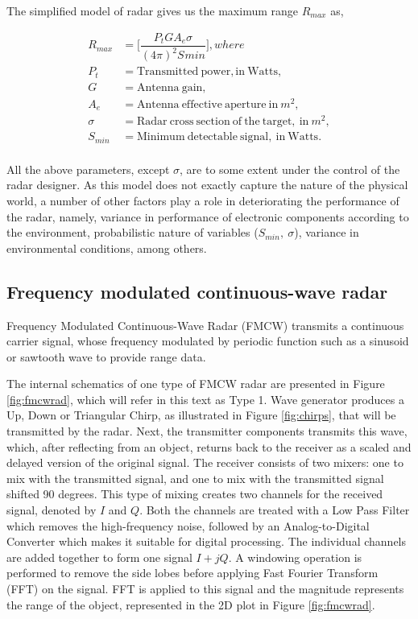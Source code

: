 The simplified model of radar gives us the maximum range $R_{max}$ as,

\begin{equation}\label{radmodel}
\begin{aligned}
R_{max}&=\bigg[ \dfrac{P_{t}GA_{e}\sigma}{(4\pi)^2S_{}min}\bigg],       where\\
P_{t} &= \mathrm{Transmitted\ power, in \ Watts,}\\
G &= \mathrm{Antenna\ gain},\\
A_{e} &= \mathrm{Antenna\  effective \ aperture \ in}\ m^2,\\
\sigma &= \mathrm{Radar \ cross \ section \ of \ the \ target,\ in} \ m^2, \\
S_{min} &= \mathrm{Minimum \ detectable \ signal, \ in \ Watts}.\\
\end{aligned}
\end{equation}




All the above parameters, except $\sigma$, are to some extent under the control of the radar designer. As this model does not exactly capture the nature of the physical world, a number of other factors play a role in deteriorating the performance of the radar, namely, variance in performance of electronic components according to the environment, probabilistic nature of variables ($S_{min},\  \sigma$), variance in environmental conditions, among others.

\subsection{Frequency modulated continuous-wave radar}
Frequency Modulated Continuous-Wave Radar (FMCW) transmits a continuous carrier signal, whose frequency modulated by periodic function such as a sinusoid or sawtooth wave to provide range data. 

The internal schematics of one type of FMCW radar are presented in Figure \ref{fig:fmcwrad}, which will refer in this text as Type 1. Wave generator produces a Up, Down or Triangular Chirp, as illustrated in Figure \ref{fig:chirps}, that will be transmitted by the radar. Next, the transmitter components transmits this wave, which, after reflecting from an object, returns back to the receiver as a scaled and delayed version of the original signal. The receiver consists of two mixers: one to mix with the transmitted signal, and one to mix with the transmitted signal shifted 90 degrees. This type of mixing creates two channels for the received signal, denoted by $I$ and $Q$. Both the channels are treated with a Low Pass Filter which removes the high-frequency noise, followed by an Analog-to-Digital Converter which makes it suitable for digital processing. The individual channels are added together to form one signal $I+jQ$. A windowing operation is performed to remove the side lobes before applying Fast Fourier Transform (FFT) on the signal. FFT  is applied to this signal and the magnitude represents the range of the object, represented in the 2D plot in Figure \ref{fig:fmcwrad}. 
  

